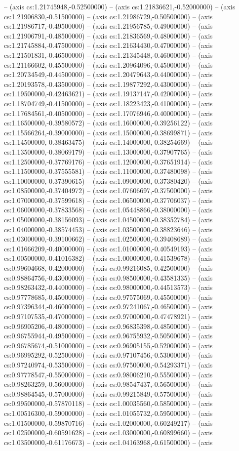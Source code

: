 -- (axis cs:1.21745948,-0.52500000) -- (axis cs:1.21836621,-0.52000000) -- (axis cs:1.21906830,-0.51500000) -- (axis cs:1.21986729,-0.50500000) -- (axis cs:1.21986717,-0.49500000) -- (axis cs:1.21956785,-0.49000000) -- (axis cs:1.21906791,-0.48500000) -- (axis cs:1.21836569,-0.48000000) -- (axis cs:1.21745884,-0.47500000) -- (axis cs:1.21634430,-0.47000000) -- (axis cs:1.21501831,-0.46500000) -- (axis cs:1.21345448,-0.46000000) -- (axis cs:1.21166602,-0.45500000) -- (axis cs:1.20964096,-0.45000000) -- (axis cs:1.20734549,-0.44500000) -- (axis cs:1.20479643,-0.44000000) -- (axis cs:1.20193578,-0.43500000) -- (axis cs:1.19877292,-0.43000000) -- (axis cs:1.19500000,-0.42463621) -- (axis cs:1.19137147,-0.42000000) -- (axis cs:1.18704749,-0.41500000) -- (axis cs:1.18223423,-0.41000000) -- (axis cs:1.17684561,-0.40500000) -- (axis cs:1.17076946,-0.40000000) -- (axis cs:1.16500000,-0.39580572) -- (axis cs:1.16000000,-0.39256122) -- (axis cs:1.15566264,-0.39000000) -- (axis cs:1.15000000,-0.38699871) -- (axis cs:1.14500000,-0.38463475) -- (axis cs:1.14000000,-0.38254669) -- (axis cs:1.13500000,-0.38069179) -- (axis cs:1.13000000,-0.37907765) -- (axis cs:1.12500000,-0.37769176) -- (axis cs:1.12000000,-0.37651914) -- (axis cs:1.11500000,-0.37555581) -- (axis cs:1.11000000,-0.37480098) -- (axis cs:1.10000000,-0.37390615) -- (axis cs:1.09000000,-0.37380420) -- (axis cs:1.08500000,-0.37404972) -- (axis cs:1.07606697,-0.37500000) -- (axis cs:1.07000000,-0.37599618) -- (axis cs:1.06500000,-0.37706037) -- (axis cs:1.06000000,-0.37833568) -- (axis cs:1.05448866,-0.38000000) -- (axis cs:1.05000000,-0.38156093) -- (axis cs:1.04500000,-0.38352784) -- (axis cs:1.04000000,-0.38574453) -- (axis cs:1.03500000,-0.38823646) -- (axis cs:1.03000000,-0.39100662) -- (axis cs:1.02500000,-0.39408689) -- (axis cs:1.01666209,-0.40000000) -- (axis cs:1.01000000,-0.40549193) -- (axis cs:1.00500000,-0.41016382) -- (axis cs:1.00000000,-0.41539678) -- (axis cs:0.99604668,-0.42000000) -- (axis cs:0.99216085,-0.42500000) -- (axis cs:0.98864756,-0.43000000) -- (axis cs:0.98500000,-0.43581335) -- (axis cs:0.98263432,-0.44000000) -- (axis cs:0.98000000,-0.44513573) -- (axis cs:0.97778685,-0.45000000) -- (axis cs:0.97575069,-0.45500000) -- (axis cs:0.97396344,-0.46000000) -- (axis cs:0.97241067,-0.46500000) -- (axis cs:0.97107535,-0.47000000) -- (axis cs:0.97000000,-0.47478921) -- (axis cs:0.96905206,-0.48000000) -- (axis cs:0.96835398,-0.48500000) -- (axis cs:0.96755944,-0.49500000) -- (axis cs:0.96755932,-0.50500000) -- (axis cs:0.96785674,-0.51000000) -- (axis cs:0.96905155,-0.52000000) -- (axis cs:0.96995292,-0.52500000) -- (axis cs:0.97107456,-0.53000000) -- (axis cs:0.97240974,-0.53500000) -- (axis cs:0.97500000,-0.54293371) -- (axis cs:0.97778547,-0.55000000) -- (axis cs:0.98006210,-0.55500000) -- (axis cs:0.98263259,-0.56000000) -- (axis cs:0.98547437,-0.56500000) -- (axis cs:0.98864545,-0.57000000) -- (axis cs:0.99215849,-0.57500000) -- (axis cs:0.99500000,-0.57870118) -- (axis cs:1.00035560,-0.58500000) -- (axis cs:1.00516300,-0.59000000) -- (axis cs:1.01055732,-0.59500000) -- (axis cs:1.01500000,-0.59870716) -- (axis cs:1.02000000,-0.60249217) -- (axis cs:1.02500000,-0.60591628) -- (axis cs:1.03000000,-0.60899660) -- (axis cs:1.03500000,-0.61176673) -- (axis cs:1.04163968,-0.61500000) -- (axis 